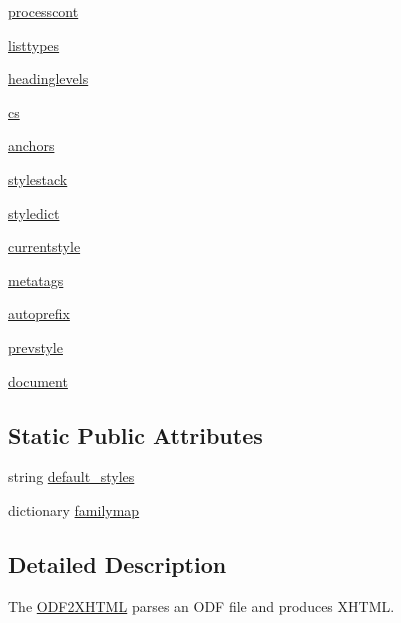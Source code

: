 \begin{DoxyCompactItemize}
\item 
\hyperlink{classodf_1_1odf2xhtml_1_1ODF2XHTML_ace8c2092ef1d4fff2a4396ef8e17b1f0}{processcont}
\item 
\hyperlink{classodf_1_1odf2xhtml_1_1ODF2XHTML_a65429f20547b22c904ecfac74e016c0b}{listtypes}
\item 
\hyperlink{classodf_1_1odf2xhtml_1_1ODF2XHTML_a946d65dea966349f82c6452a8ad06ca2}{headinglevels}
\item 
\hyperlink{classodf_1_1odf2xhtml_1_1ODF2XHTML_ac0b77e6c1bab706b2ec96c5b27597ca5}{cs}
\item 
\hyperlink{classodf_1_1odf2xhtml_1_1ODF2XHTML_ae998099d573b26bb4e129bce3cde4748}{anchors}
\item 
\hyperlink{classodf_1_1odf2xhtml_1_1ODF2XHTML_aa4517811274efe365e06423e6481f6f0}{stylestack}
\item 
\hyperlink{classodf_1_1odf2xhtml_1_1ODF2XHTML_a4b62c330ad474bfc40c4c926fc9cd0c3}{styledict}
\item 
\hyperlink{classodf_1_1odf2xhtml_1_1ODF2XHTML_a0c95380c2d3df7c17d1388280c3043ff}{currentstyle}
\item 
\hyperlink{classodf_1_1odf2xhtml_1_1ODF2XHTML_a58f1e2d5aa79075196d12ded2da6f94d}{metatags}
\item 
\hyperlink{classodf_1_1odf2xhtml_1_1ODF2XHTML_a302ff4588ab242e144727d76160985d5}{autoprefix}
\item 
\hyperlink{classodf_1_1odf2xhtml_1_1ODF2XHTML_ad9f80d3b7eb1a6f870db682101b9dcf2}{prevstyle}
\item 
\hyperlink{classodf_1_1odf2xhtml_1_1ODF2XHTML_af3577d531508337a572dbf8ed0aa8815}{document}
\end{DoxyCompactItemize}
\subsection*{Static Public Attributes}
\begin{DoxyCompactItemize}
\item 
string \hyperlink{classodf_1_1odf2xhtml_1_1ODF2XHTML_aeb0c7130ee5ac5610e92dbcc49605c23}{default\+\_\+styles}
\item 
dictionary \hyperlink{classodf_1_1odf2xhtml_1_1ODF2XHTML_ab9f1f2aaedcd6762d8c0c5eaf734d435}{familymap}
\end{DoxyCompactItemize}


\subsection{Detailed Description}
The \hyperlink{classodf_1_1odf2xhtml_1_1ODF2XHTML}{O\+D\+F2\+X\+H\+T\+M\+L} parses an O\+D\+F file and produces X\+H\+T\+M\+L. 

